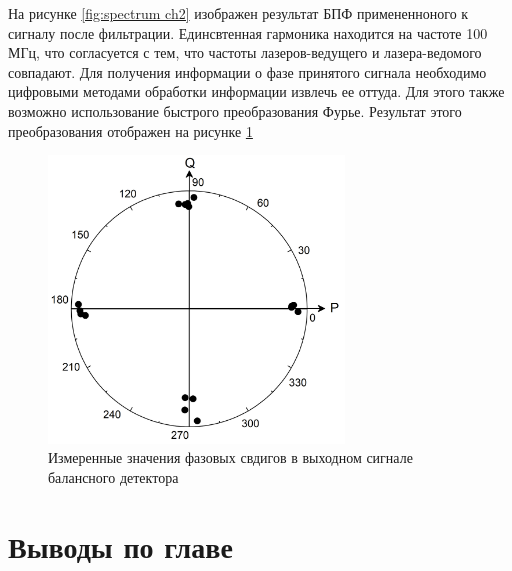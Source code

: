 На рисунке \ref{fig:spectrum ch2} изображен результат БПФ примененноного к сигналу после фильтрации. Единсвтенная гармоника находится на частоте 100 МГц, что согласуется с тем, что частоты лазеров-ведущего и лазера-ведомого совпадают.
Для получения информации о фазе принятого сигнала необходимо цифровыми методами обработки информации извлечь ее оттуда. Для этого также возможно использование быстрого преобразования Фурье. Результат этого преобразования отображен на рисунке \ref{fig:phase meas ch2} 
\begin{figure}
    \centering
    \includegraphics[width=0.7\textwidth]{images/06.png}
    \caption{Измеренные значения фазовых свдигов в выходном сигнале балансного детектора}
    \label{fig:phase meas ch2}
\end{figure}


\section{Выводы по главе}\label{sec:ch2/sect8}

